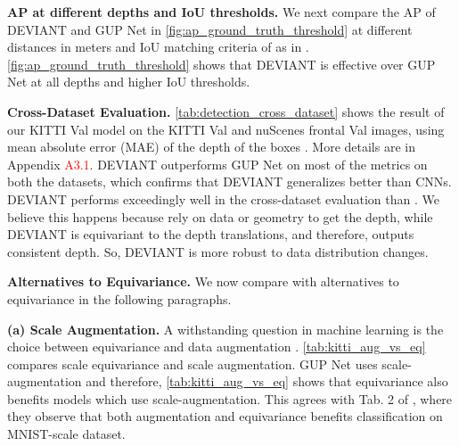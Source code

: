 \documentclass[runningheads]{llncs}
\newcommand{\iou}{IoU}
\newcommand{\iouThreeD}{\iou}
\newcommand{\equivariant} {equivariant}
\newcommand{\equivariance}{equivariance}
\newcommand{\Equivariance}{Equivariance}
\newcommand{\scaleEquivariance}{scale \equivariance}
\newcommand{\kitti}{KITTI}
\newcommand{\nuscenes}{nuScenes}
\newcommand{\valOne}{Val}
\newcommand{\val}{Val}
\newcommand{\frontal}{frontal}
\newcommand{\ap}{AP}
\newcommand{\apThreeD}{\ap}
\newcommand{\gupNet}{GUP Net}
\newcommand{\noIndentHeading}[1]{\noindent\textbf{#1}}
\newcommand{\refSupApp}[1]{Appendix \textcolor{red}{A#1}}
\newcommand{\methodName}{DEVIANT}
\begin{document}
\noIndentHeading{\apThreeD{} at different depths and \iouThreeD{} thresholds.}
            We next compare the \apThreeD{} of \methodName{} and \gupNet{} in \cref{fig:ap_ground_truth_threshold} at different distances in meters and \iouThreeD{} matching criteria of  as in \cite{kumar2021groomed}. 
            \cref{fig:ap_ground_truth_threshold} shows that \methodName{} is effective over \gupNet{} \cite{lu2021geometry} at all depths and higher \iouThreeD{} thresholds.
                            
\noIndentHeading{Cross-Dataset Evaluation.}
            \cref{tab:detection_cross_dataset} shows the result of our \kitti{} \valOne{} model on the \kitti{} \valOne{} and \nuscenes{} \cite{caesar2020nuscenes} \frontal{} \val{} images, using mean absolute error (MAE) of the depth of the boxes \cite{shi2021geometry}.
            More details are in \refSupApp{3.1}. \methodName{} outperforms \gupNet{} on most of the metrics on both the datasets, which confirms that \methodName{} generalizes better than CNNs. 
            \methodName{} performs exceedingly well in the cross-dataset evaluation than \cite{brazil2019m3d, shi2021geometry, lu2021geometry}.
            We believe this happens because \cite{brazil2019m3d, shi2021geometry, lu2021geometry} rely on data or geometry to get the depth, while \methodName{} is \equivariant{} to the depth translations, and therefore, outputs consistent depth. 
            So, \methodName{} is more robust to data distribution changes. 

\noIndentHeading{Alternatives to \Equivariance.} We now compare with alternatives to \equivariance{} in the following paragraphs.
                
\noIndentHeading{(a) Scale Augmentation.}
            A withstanding question in machine learning is the choice between \equivariance{} and data augmentation \cite{gandikota2021training}.
            \cref{tab:kitti_aug_vs_eq} compares \scaleEquivariance{} and scale augmentation.
            \gupNet{} \cite{lu2021geometry} uses scale-augmentation and therefore, \cref{tab:kitti_aug_vs_eq} shows that \equivariance{} also benefits models which use scale-augmentation. 
            This agrees with Tab. 2 of \cite{sosnovik2020sesn}, where they observe that both augmentation and \equivariance{} benefits classification on MNIST-scale dataset.
\end{document}

